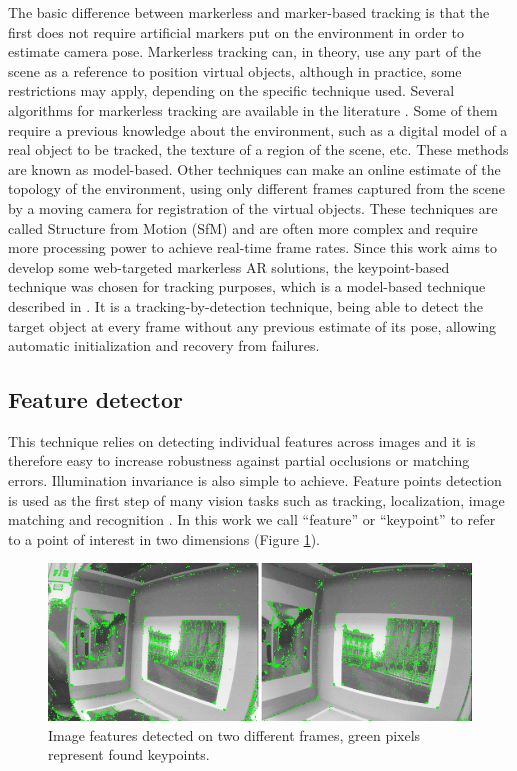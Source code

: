 The basic difference between markerless and marker-based tracking is that the first does not require artificial markers put on the environment in order to estimate camera pose. Markerless tracking can, in theory, use any part of the scene as a reference to position virtual objects, although in practice, some restrictions may apply, depending on the specific technique used. Several algorithms for markerless tracking are available in the literature \cite{Teichrieb2007}. Some of them require a previous knowledge about the environment, such as a digital model of a real object to be tracked, the texture of a region of the scene, etc. These methods are known as model-based. Other techniques can make an online estimate of the topology of the environment, using only different frames captured from the scene by a moving camera for registration of the virtual objects. These techniques are called Structure from Motion (SfM) and are often more complex and require more processing power to achieve real-time frame rates. Since this work aims to develop some web-targeted markerless AR solutions, the keypoint-based technique was chosen for tracking purposes, which is a model-based technique described in \cite{Teichrieb2010}. It is a tracking-by-detection technique, being able to detect the target object at every frame without any previous estimate of its pose, allowing automatic initialization and recovery from failures.


\subsection{Feature detector} %
\label{sub:tracking_library_for_the_web:marker_less_tracking_algorithm:feature_detector}

This technique relies on detecting individual features across images and it is therefore easy to increase robustness against partial occlusions or matching errors. Illumination invariance is also simple to achieve. Feature points detection is used as the first step of many vision tasks such as tracking, localization, image matching and recognition \cite{Lepetit2005}. In this work we call ``feature'' or ``keypoint'' to refer to a point of interest in two dimensions (Figure \ref{figure:keypoints}).

\begin{figure}[!htb]
  \centering
  \includegraphics[width=380pt]{chapters/tracking_library_for_the_web/keypoints.png}
  \caption{Image features detected on two different frames, green pixels represent found keypoints.}
  \label{figure:keypoints}
\end{figure}


